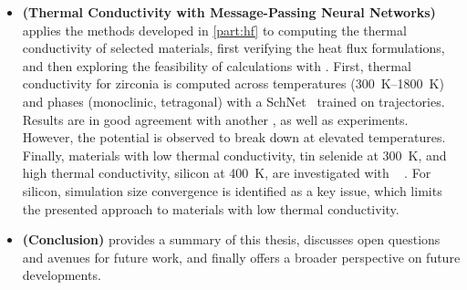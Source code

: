 \begin{itemize}[itemsep=0pt,topsep=0.5\baselineskip]
  \item \textbf{ (Thermal Conductivity with Message-Passing Neural Networks)} applies the methods developed in \cref{part:hf} to computing the thermal conductivity of selected materials, first verifying the heat flux formulations, and then exploring the feasibility of \gk calculations with \mpnns. First, thermal conductivity for zirconia is computed across temperatures (\qtyrange{300}{1800}{K}) and phases (monoclinic, tetragonal) with a SchNet~\cite{sktm2017q,sstm2018q} \glp trained on \aimd trajectories. Results are in good agreement with another \mlp, as well as experiments. However, the potential is observed to break down at elevated temperatures. Finally, materials with low thermal conductivity, tin selenide at \qty{300}{K}, and high thermal conductivity, silicon at \qty{400}{K}, are investigated with \sok~\cite{fum2022q} \glps. For silicon, simulation size convergence is identified as a key issue, which limits the presented approach to materials with low thermal conductivity.
  \item \textbf{ (Conclusion)} provides a summary of this thesis, discusses open questions and avenues for future work, and finally offers a broader perspective on future developments.
\end{itemize}

